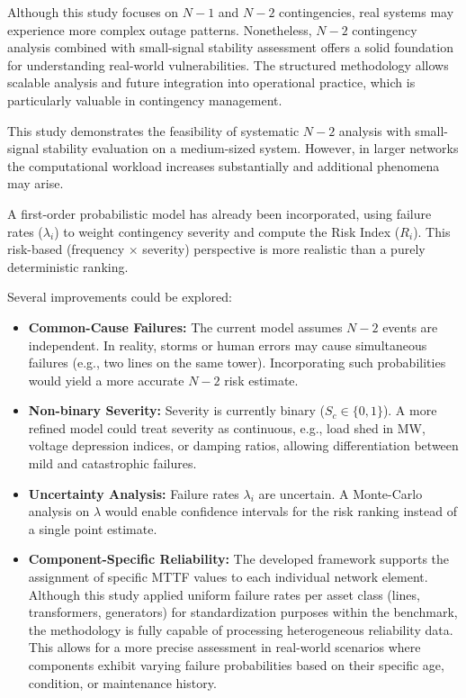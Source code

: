 \documentclass[journal]{IEEEtran}
\begin{document}
Although this study focuses on $N-1$ and $N-2$ contingencies, real systems may experience more complex outage patterns. Nonetheless, $N-2$ contingency analysis combined with small-signal stability assessment offers a solid foundation for understanding real-world vulnerabilities. The structured methodology allows scalable analysis and future integration into operational practice, which is particularly valuable in contingency management.

This study demonstrates the feasibility of systematic $N-2$ analysis with small-signal stability evaluation on a medium-sized system. However, in larger networks the computational workload increases substantially and additional phenomena may arise.

A first-order probabilistic model has already been incorporated, using failure rates ($\lambda_i$) to weight contingency severity and compute the Risk Index ($R_i$). This risk-based (frequency $\times$ severity) perspective is more realistic than a purely deterministic ranking.

Several improvements could be explored:

\begin{itemize}
    \item \textbf{Common-Cause Failures:} The current model assumes $N-2$ events are independent. In reality, storms or human errors may cause simultaneous failures (e.g., two lines on the same tower). Incorporating such probabilities would yield a more accurate $N-2$ risk estimate.
    \item \textbf{Non-binary Severity:} Severity is currently binary ($S_c \in \{0,1\}$). A more refined model could treat severity as continuous, e.g., load shed in MW, voltage depression indices, or damping ratios, allowing differentiation between mild and catastrophic failures.
    \item \textbf{Uncertainty Analysis:} Failure rates $\lambda_i$ are uncertain. A Monte-Carlo analysis on $\lambda$ would enable confidence intervals for the risk ranking instead of a single point estimate.
    \item \textbf{Component-Specific Reliability:} The developed framework supports the assignment of specific MTTF values to each individual network element. Although this study applied uniform failure rates per asset class (lines, transformers, generators) for standardization purposes within the benchmark, the methodology is fully capable of processing heterogeneous reliability data. This allows for a more precise assessment in real-world scenarios where components exhibit varying failure probabilities based on their specific age, condition, or maintenance history.

\end{itemize}
\end{document}
